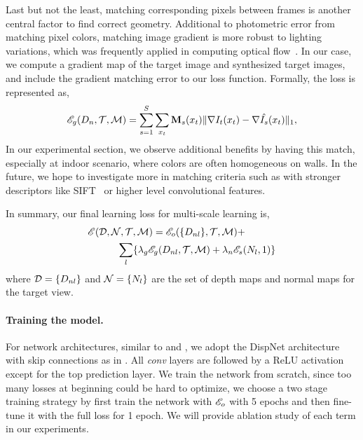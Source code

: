 Last but not the least, matching corresponding pixels between frames is another central factor to find correct geometry. Additional to photometric error from matching pixel colors, matching image gradient is more robust to lighting variations, which was frequently applied in computing optical flow~\cite{li2017pyramidal}. 
In our case, we compute a gradient map of the target image and synthesized target images, and include the gradient matching error to our loss function. Formally, the loss is represented as,
\begin{align}
\label{equ:gradient}
{\mathscr E}_{g}(D_n, {\mathcal T}, {\mathcal M}) = \sum_{s=1}^{S}\sum_{x_t}{\mathbf M}_s(x_t)\|\nabla I_t(x_t) - \nabla \hat{I_s}(x_t)\|_1, \nonumber
\end{align}
In our experimental section, we observe additional benefits by having this match, especially at indoor scenario, where colors are often homogeneous on walls.
In the future, we hope to investigate more in matching criteria such as with stronger descriptors like SIFT~\cite{liu2011sift} or higher level convolutional features.

In summary, our final learning loss for multi-scale learning is,
\begin{align}
&{\mathscr E}({\mathcal D}, {\mathcal N}, {\mathcal T}, {\mathcal M}) = {\mathscr E}_{o}(\{D_{nl}\}, {\mathcal T}, {\mathcal M}) + \nonumber\\
&\text{~~~~~~~~~}\sum_l\{\lambda_g{\mathscr E}_{g}(D_{nl},{\mathcal T},{\mathcal M}) + \lambda_n{\mathscr E}_{s}(N_l, 1)\}
\end{align}
where ${\mathcal D} = \{D_{nl}\}$ and ${\mathcal N} = \{N_{l}\}$ are the set of depth maps and normal maps for the target view.


\paragraph{Training the model.} For network architectures, similar to \cite{zhou2017unsupervised} and \cite{godard2016unsupervised}, we adopt the DispNet \cite{mayer2016large} architecture with skip connections as in \cite{zhou2017unsupervised}. All \textit{conv} layers are followed by a ReLU activation except for the top prediction layer. We train the network from scratch, since too many losses at beginning could be hard to optimize, we choose a two stage training strategy by first train the network with ${\mathscr E}_{o}$ with 5 epochs and then fine-tune it with the full loss for 1 epoch. We will provide ablation study of each term in our experiments.



